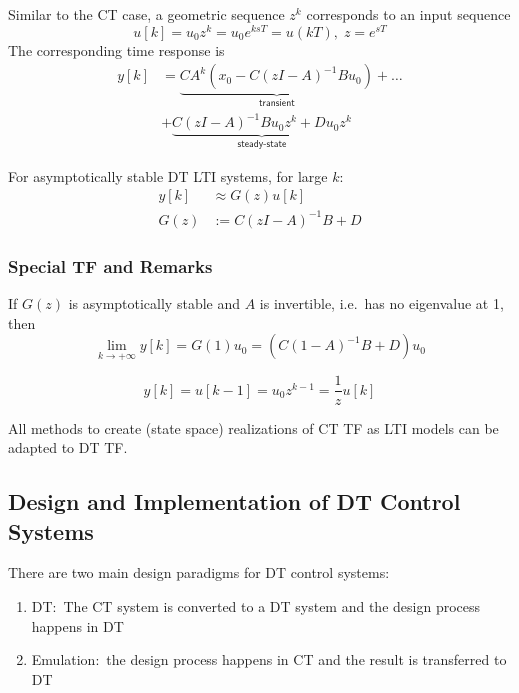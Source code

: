 Similar to the CT case, a geometric sequence $z^k$ corresponds to an input sequence
\begin{equation*}
    u[k] =u_0z^k=u_0e^{ksT}=u(kT), \; z=e^{sT}
\end{equation*}
The corresponding time response is
\begin{align*}
    y[k] & = \underbrace{CA^k(x_0-C{(zI-A)}^{-1}Bu_0)}_{\textsf{transient}}+\dots \\
         & +\underbrace{C{(zI-A)}^{-1}Bu_0z^k+Du_0z^k}_{\textsf{steady-state}}
\end{align*}


For asymptotically stable DT LTI systems, for large $k$:
\begin{align*}
    y[k] & \approx G(z)u[k]    \\
    G(z) & :=C{(zI-A)}^{-1}B+D
\end{align*}
\subsubsection{Special TF and Remarks}

If $G(z)$ is asymptotically stable and $A$ is invertible, i.e.\ has no eigenvalue at 1, then
\begin{equation*}
    \lim_{k\to+\infty}y[k]=G(1)u_0=(C{(1-A)}^{-1}B+D)u_0
\end{equation*}


\begin{equation*}
    y[k] =u[k-1] =u_0z^{k-1}=\frac1zu[k]
\end{equation*}


All methods to create (state space) realizations of CT TF as LTI models can be adapted to DT TF.

\subsection{Design and Implementation of DT Control Systems}
There are two main design paradigms for DT control systems:
\begin{enumerate}
    \item DT:\ The CT system is converted to a DT system and the design process happens in DT
    \item Emulation:\ the design process happens in CT and the result is transferred to DT
\end{enumerate}

